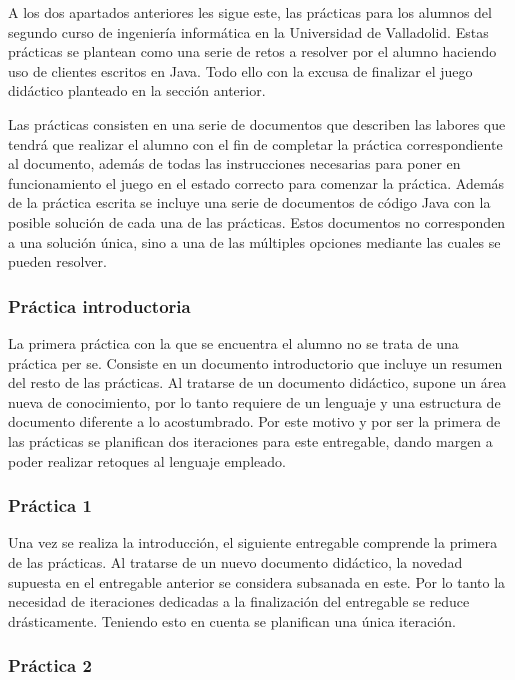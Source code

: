 A los dos apartados anteriores les sigue este, las prácticas para los alumnos del segundo curso de ingeniería informática en la Universidad de Valladolid. Estas prácticas se plantean como una serie de retos a resolver por el alumno haciendo uso de clientes escritos en Java. Todo ello con la excusa de finalizar el juego didáctico planteado en la sección anterior.

Las prácticas consisten en una serie de documentos que describen las labores que tendrá que realizar el alumno con el fin de completar la práctica correspondiente al documento, además de todas las instrucciones necesarias para poner en funcionamiento el juego en el estado correcto para comenzar la práctica. Además de la práctica escrita se incluye una serie de documentos de código Java con la posible solución de cada una de las prácticas. Estos documentos no corresponden a una solución única, sino a una de las múltiples opciones mediante las cuales se pueden resolver.

\subsubsection{Práctica introductoria}

La primera práctica con la que se encuentra el alumno no se trata de una práctica per se. Consiste en un documento introductorio que incluye un resumen del resto de las prácticas. Al tratarse de un documento didáctico, supone un área nueva de conocimiento, por lo tanto requiere de un lenguaje y una estructura de documento diferente a lo acostumbrado. Por este motivo y por ser la primera de las prácticas se planifican dos iteraciones para este entregable, dando margen a poder realizar retoques al lenguaje empleado.

\subsubsection{Práctica 1}

Una vez se realiza la introducción, el siguiente entregable comprende la primera de las prácticas. Al tratarse de un nuevo documento didáctico, la novedad supuesta en el entregable anterior se considera subsanada en este. Por lo tanto la necesidad de iteraciones dedicadas a la finalización del entregable se reduce drásticamente. Teniendo esto en cuenta se planifican una única iteración.

\subsubsection{Práctica 2}

